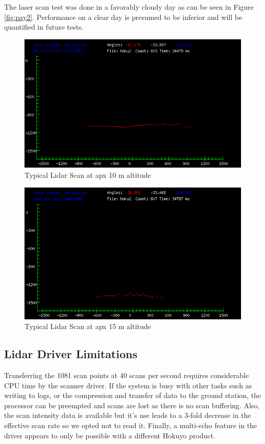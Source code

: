 \documentclass[a4paper,11pt]{report}
\begin{document}
The laser scan test was done in a favorably cloudy day as can be seen in Figure \ref{fig:pay2}. Performance on a clear day is presumed to be inferior and will be quantified in future tests.

\begin{figure}[ht]
 \centering
 \includegraphics[width=12cm]{scan603.png}
 \caption{Typical Lidar Scan at apx 10 m altitude}
 \label{fig:lidar_scan1}
\end{figure}

\begin{figure}[ht]
 \centering
 \includegraphics[width=12cm]{scan607.png}
 \caption{Typical Lidar Scan at apx 15 m altitude}
 \label{fig:lidar_scan2}
\end{figure}

\subsection{Lidar Driver Limitations}

Transferring the 1081 scan points at 40 scans per second requires considerable CPU time by the scanner driver. If the system is busy with other tasks such as writing to logs, or the compression and transfer of data to the ground station, the processor can be preempted and scans are lost as there is no scan buffering. Also, the scan intensity data is available but it's use leads to a 3-fold decrease in the effective scan rate so we opted not to read it. Finally, a multi-echo feature in the driver appears to only be possible with a different Hokuyo product.
\end{document}
